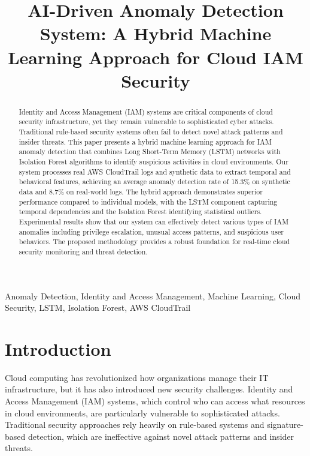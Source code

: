 \documentclass[conference]{IEEEtran}
\begin{document}
\title{AI-Driven Anomaly Detection System: A Hybrid Machine Learning Approach for Cloud IAM Security}

\author{
}

\maketitle

\begin{abstract}
Identity and Access Management (IAM) systems are critical components of cloud security infrastructure, yet they remain vulnerable to sophisticated cyber attacks. Traditional rule-based security systems often fail to detect novel attack patterns and insider threats. This paper presents a hybrid machine learning approach for IAM anomaly detection that combines Long Short-Term Memory (LSTM) networks with Isolation Forest algorithms to identify suspicious activities in cloud environments. Our system processes real AWS CloudTrail logs and synthetic data to extract temporal and behavioral features, achieving an average anomaly detection rate of 15.3\% on synthetic data and 8.7\% on real-world logs. The hybrid approach demonstrates superior performance compared to individual models, with the LSTM component capturing temporal dependencies and the Isolation Forest identifying statistical outliers. Experimental results show that our system can effectively detect various types of IAM anomalies including privilege escalation, unusual access patterns, and suspicious user behaviors. The proposed methodology provides a robust foundation for real-time cloud security monitoring and threat detection.
\end{abstract}

\begin{IEEEkeywords}
Anomaly Detection, Identity and Access Management, Machine Learning, Cloud Security, LSTM, Isolation Forest, AWS CloudTrail
\end{IEEEkeywords}

\section{Introduction}
Cloud computing has revolutionized how organizations manage their IT infrastructure, but it has also introduced new security challenges. Identity and Access Management (IAM) systems, which control who can access what resources in cloud environments, are particularly vulnerable to sophisticated attacks. Traditional security approaches rely heavily on rule-based systems and signature-based detection, which are ineffective against novel attack patterns and insider threats.
\end{document}
